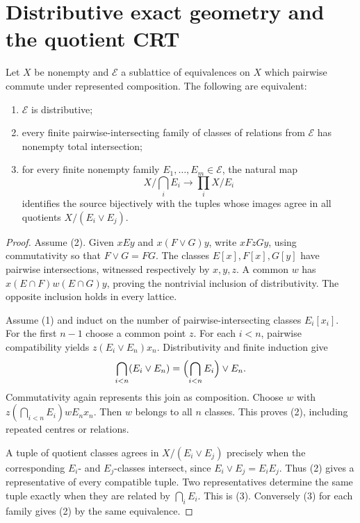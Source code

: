 
\section{Distributive exact geometry and the quotient CRT}
\label{sec:exact-crt}

\begin{theorem}
\label{thm:abstract-exact-crt}
Let $X$ be nonempty and $\mathcal E$ a sublattice of equivalences
on $X$ which pairwise commute under represented composition.  The
following are equivalent:
\begin{enumerate}
\item $\mathcal E$ is distributive;
\item every finite pairwise-intersecting family of classes of relations
      from $\mathcal E$ has nonempty total intersection;
\item for every finite nonempty family $E_1,\ldots,E_m\in\mathcal E$,
      the natural map
\[
 X/\bigcap_i E_i\longrightarrow\prod_i X/E_i
\]
      identifies the source bijectively with the tuples whose images
      agree in all quotients $X/(E_i\vee E_j)$.
\end{enumerate}
\end{theorem}
\begin{proof}
Assume (2).  Given $xEy$ and $x(F\vee G)y$, write
$xFzGy$, using commutativity so that $F\vee G=FG$.
The classes $E[x],F[x],G[y]$ have pairwise intersections,
witnessed respectively by $x,y,z$.  A common $w$ has
$x(E\cap F)w(E\cap G)y$, proving the nontrivial inclusion of
distributivity.  The opposite inclusion holds in every lattice.

Assume (1) and induct on the number of pairwise-intersecting
classes $E_i[x_i]$.  For the first $n-1$ choose a common point $z$.
For each $i<n$, pairwise compatibility yields
$z(E_i\vee E_n)x_n$.  Distributivity and finite induction give
\[
 \bigcap_{i<n}(E_i\vee E_n)
       =\Bigl(\bigcap_{i<n}E_i\Bigr)\vee E_n.
\]
Commutativity again represents this join as composition.
Choose $w$ with $z(\bigcap_{i<n}E_i)wE_nx_n$.
Then $w$ belongs to all $n$ classes.  This proves (2),
including repeated centres or relations.

A tuple of quotient classes agrees in $X/(E_i\vee E_j)$ precisely
when the corresponding $E_i$- and $E_j$-classes intersect, since
$E_i\vee E_j=E_iE_j$.  Thus (2) gives a representative of every
compatible tuple.  Two representatives determine the same tuple
exactly when they are related by $\bigcap_iE_i$.  This is (3).
Conversely (3) for each family gives (2) by the same equivalence.
\end{proof}


